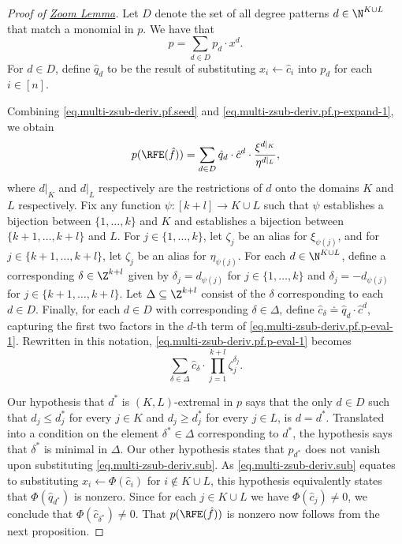 \documentclass{toc}
\begin{document}
\begin{proof}[Proof of \texorpdfstring{\hyperref[lem.multi-zsub-deriv]{Zoom Lemma}}{Zoom Lemma}]
  Let $D$ denote the set of all degree patterns $d \in \N^{K \cup L}$ that
  match a monomial in $p$.
  We have that
  \begin{equation} \label{eq.multi-zsub-deriv.pf.p-expand-1}
    p = \sum_{d\in D} p_d \cdot x^d.
  \end{equation}
  For $d \in D$, define \(\hat{q}_d\) to be the result of substituting
  \(x_i \gets \hat{c}_i\) into $p_d$ for each $i \in [n]$.

  Combining \eqref{eq.multi-zsub-deriv.pf.seed} and
  \eqref{eq.multi-zsub-deriv.pf.p-expand-1},
  we obtain
  \begin{equation}\label{eq.multi-zsub-deriv.pf.p-eval-1}
    p(\RFE(\hat{f}))
    =
    \sum_{d\in D} \hat{q}_d \cdot \hat{c}^d \cdot
      \frac{\xi^{d|_K}}{\eta^{d|_L}},
  \end{equation}
  where \(d|_K\) and \(d|_L\) respectively are the restrictions of \(d\) onto the domains \(K\) and \(L\) respectively.
  Fix any function \(\psi : [k+l] \to K\cup L\) such that
  \(\psi\) establishes a bijection between \(\{1,\ldots,k\}\) and \(K\)
  and establishes a bijection between \(\{k+1,\ldots,k+l\}\) and \(L\).
  For $j \in \{1,\dots,k\}$, let \(\zeta_j\) be an alias for \(\xi_{\psi(j)}\),
  and for $j \in \{k+1,\dots,k+l\}$, let \(\zeta_j\) be an alias for
  \(\eta_{\psi(j)}\).
  For each \(d \in \N^{K\cup L}\),
  define a corresponding \(\delta \in \Z^{k+l}\) given by
  \(\delta_j = d_{\psi(j)}\) for $j \in \{1,\dots,k\}$ and
  \(\delta_j = -d_{\psi(j)}\) for $j \in \{k+1,\dots,k+l\}$.
  Let \(\Delta \subseteq \Z^{k+l}\) consist of the \(\delta\) corresponding
  to each \(d \in D\).
  Finally, for each \(d \in D\) with corresponding \(\delta \in \Delta\),
  define
  $\hat{c}_\delta \doteq \hat{q}_d \cdot \hat{c}^d$,
  capturing the first two factors in the \(d\)-th term of
  \eqref{eq.multi-zsub-deriv.pf.p-eval-1}.
  Rewritten in this notation,
  \eqref{eq.multi-zsub-deriv.pf.p-eval-1} becomes
  \begin{equation}
    \sum_{\delta\in \Delta}
      \hat{c}_\delta \cdot
      \prod_{j=1}^{k+l} \zeta_j^{\delta_j}.
  \end{equation}

  Our hypothesis that $d^*$ is \((K,L)\)-extremal in \(p\)
  says that the only \(d \in D\) such that $d_j \le d^*_j$ for every $j \in K$
  and $d_j \ge d^*_j$ for every $j \in L$, is $d = d^*$.
  Translated into a condition on the element $\delta^* \in \Delta$
  corresponding to $d^*$,
  the hypothesis says that $\delta^*$ is minimal in $\Delta$.
  Our other hypothesis states that $p_{d^*}$ does not
  vanish upon substituting \eqref{eq.multi-zsub-deriv.sub}.
  As \eqref{eq.multi-zsub-deriv.sub} equates to substituting
  \(x_i \gets \Phi(\hat{c}_i)\) for \(i \not\in K \cup L\),
  this hypothesis equivalently states that \(\Phi(\hat{q}_{d^*})\) is nonzero.
  Since for each \(j \in K \cup L\) we have \(\Phi(\hat{c}_j) \ne 0\),
  we conclude that \(\Phi(\hat{c}_{\delta^*}) \ne 0\).
  That \(p(\RFE(\hat{f}))\) is nonzero now follows from the next proposition.
\end{proof}
\end{document}
